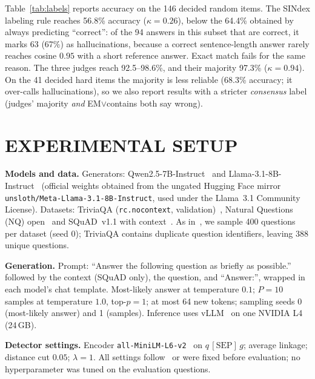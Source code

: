 \documentclass{ieeetj}
\begin{document}


Table~\ref{tab:labels} reports accuracy on the 146 decided random items. The SINdex labeling rule reaches 56.8\% accuracy ($\kappa=0.26$), below the 64.4\% obtained by always predicting ``correct'': of the 94 answers in this subset that are correct, it marks 63 (67\%) as hallucinations, because a correct sentence-length answer rarely reaches cosine $0.95$ with a short reference answer. Exact match fails for the same reason. The three judges reach 92.5--98.6\%, and their majority 97.3\% ($\kappa=0.94$). On the 41 decided hard items the majority is less reliable (68.3\% accuracy; it over-calls hallucinations), so we also report results with a stricter \emph{consensus} label (judges' majority \emph{and} EM$\lor$contains both say wrong).

\section{EXPERIMENTAL SETUP}\label{sec:setup}
\textbf{Models and data.} Generators: Qwen2.5-7B-Instruct~\cite{qwen2025} and Llama-3.1-8B-Instruct~\cite{dubey2024llama} (official weights obtained from the ungated Hugging Face mirror \nolinkurl{unsloth/Meta-Llama-3.1-8B-Instruct}, used under the Llama~3.1 Community License). Datasets: TriviaQA (\texttt{rc.nocontext}, validation)~\cite{joshi2017triviaqa}, Natural Questions (NQ) open~\cite{kwiatkowski2019natural,lee2019latent} and SQuAD~v1.1 with context~\cite{rajpurkar2016squad}. As in~\cite{abdaljalil2026sindex}, we sample 400 questions per dataset (seed 0); TriviaQA contains duplicate question identifiers, leaving 388 unique questions.

\textbf{Generation.} Prompt: ``Answer the following question as briefly as possible.'' followed by the context (SQuAD only), the question, and ``Answer:'', wrapped in each model's chat template. Most-likely answer at temperature $0.1$; $P=10$ samples at temperature $1.0$, top-$p=1$; at most 64 new tokens; sampling seeds 0 (most-likely answer) and 1 (samples). Inference uses vLLM~\cite{kwon2023efficient} on one NVIDIA L4 (24\,GB).

\textbf{Detector settings.} Encoder \texttt{all-MiniLM-L6-v2}~\cite{reimers2019sbert,wang2020minilm} on $q\,[\mathrm{SEP}]\,g$; average linkage; distance cut $0.05$; $\lambda=1$. All settings follow~\cite{abdaljalil2026sindex} or were fixed before evaluation; no hyperparameter was tuned on the evaluation questions.
\end{document}
